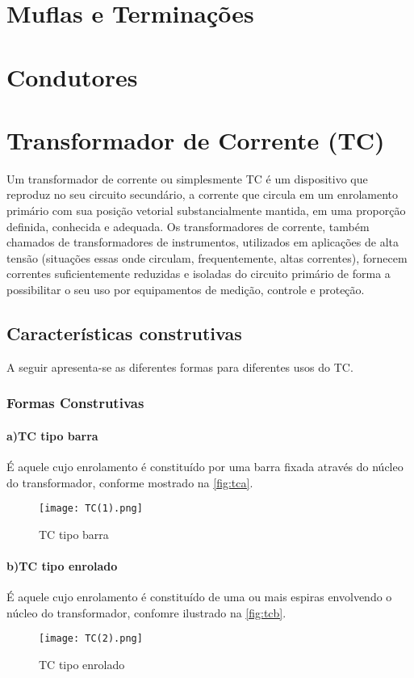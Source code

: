 	\section{Muflas e Terminações}

	\section{Condutores}

	\section{Transformador de Corrente (TC)}
		Um transformador de corrente ou simplesmente TC é um dispositivo que reproduz no seu circuito secundário, a corrente que circula em um enrolamento primário com sua posição vetorial substancialmente mantida, em uma proporção definida, conhecida e adequada. Os transformadores de corrente, também chamados de transformadores de instrumentos, utilizados em aplicações de alta tensão (situações essas onde circulam, frequentemente, altas correntes), fornecem correntes suficientemente reduzidas e isoladas do circuito primário de forma a possibilitar o seu uso por equipamentos de medição, controle e proteção.\cite{mamedemanual}

		\subsection{Características construtivas}
			A seguir apresenta-se as diferentes formas para diferentes usos do TC.

			\subsubsection{Formas Construtivas}
				\paragraph*{a)\indent TC tipo barra}
					É aquele cujo enrolamento é constituído por uma barra fixada através do núcleo do transformador, conforme mostrado na \autoref{fig:tca}.
					\begin{figure}[htb]
						\caption{TC tipo barra}
						\centering
						\texttt{[image: TC(1).png]}
						\label{fig:tca}
					\end{figure}
				\paragraph*{b)\indent TC tipo enrolado}
					É aquele cujo enrolamento é constituído de uma ou mais espiras envolvendo o núcleo do transformador, confomre ilustrado na \autoref{fig:tcb}.
					\begin{figure}[htb]
						\caption{TC tipo enrolado}
						\centering
						\texttt{[image: TC(2).png]}
						\label{fig:tcb}
					\end{figure}
